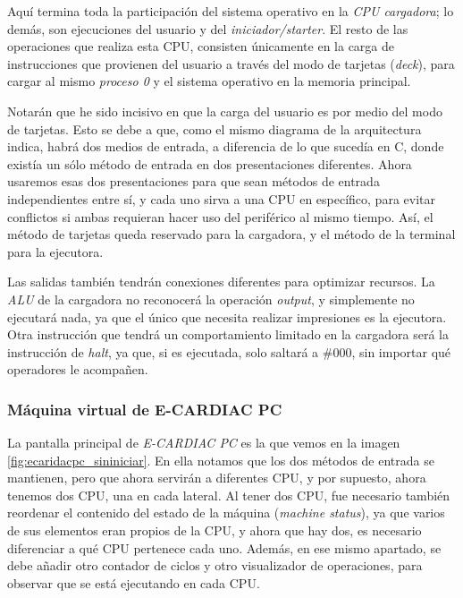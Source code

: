 \documentclass[letterpaper,12pt,oneside]{book}
\begin{document}
			
			Aquí termina toda la participación del sistema operativo en la \textit{CPU cargadora};
			lo demás, son ejecuciones del usuario y del \textit{iniciador/starter}. El resto de las operaciones 
			que realiza esta CPU, consisten únicamente en la carga de instrucciones que provienen 
			del usuario a través del modo de tarjetas (\textit{deck}), para cargar al mismo 
			\textit{proceso 0} y el sistema operativo en la memoria principal.
   
            Notarán que he sido incisivo en que la carga del usuario es por medio del modo
			de tarjetas. Esto se debe a que, como el mismo diagrama de la arquitectura indica, 
			habrá dos medios de entrada, a diferencia de lo que sucedía
			en C, donde existía un sólo
			método de entrada  en dos presentaciones diferentes. Ahora usaremos esas dos presentaciones para que sean métodos
			de entrada independientes entre sí, y cada uno sirva a una CPU en específico, para evitar conflictos si ambas requieran hacer
			uso del periférico al mismo tiempo. Así, el método de tarjetas queda reservado para la cargadora, y el método de la terminal para la 
			ejecutora.

            Las salidas también tendrán conexiones diferentes para optimizar recursos.
            La \textit{ALU} de la cargadora no reconocerá la operación \textit{output}, y simplemente
			no ejecutará nada, ya que el único que necesita realizar impresiones es la ejecutora. Otra instrucción que tendrá un comportamiento 
			limitado en la cargadora será la instrucción de \textit{halt}, ya que, si es ejecutada, solo saltará a \#000, sin importar
			qué operadores le acompañen.
			

			
			\subsubsection{Máquina virtual de E-CARDIAC PC}
			
			La pantalla principal de \textit{E-CARDIAC PC} es la que vemos en la imagen \ref{fig:ecaridacpc_sininiciar}. En ella notamos que los 
			dos métodos	de entrada se mantienen, pero que ahora servirán a diferentes CPU, 
			y por supuesto, ahora tenemos dos CPU, una en cada lateral. Al tener dos CPU, fue necesario
			también reordenar el contenido del estado de la máquina (\textit{machine status}), ya que varios de sus elementos eran propios de la CPU, y 
			ahora que hay dos, es necesario
			diferenciar a qué CPU pertenece cada uno. Además, en ese mismo apartado, se debe añadir otro contador de ciclos y otro
			visualizador de operaciones, para observar que se está ejecutando en cada CPU.
			
\end{document}
